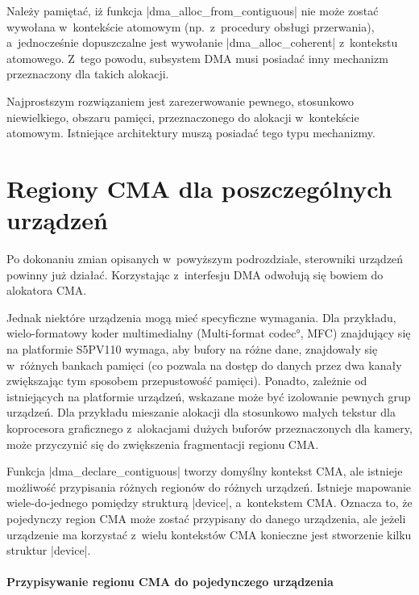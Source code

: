Należy pamiętać, iż funkcja \code|dma_alloc_from_contiguous|
nie może zostać wywołana w~kontekście atomowym (np.\ z~procedury
obsługi przerwania), a~jednocześnie dopuszczalne jest wywołanie
\code|dma_alloc_coherent| z~kontekstu atomowego.  Z~tego
powodu, subsystem DMA musi posiadać inny mechanizm przeznaczony dla
takich alokacji.

Najprostszym rozwiązaniem jest zarezerwowanie pewnego, stosunkowo
niewielkiego, obszaru pamięci, przeznaczonego do alokacji w~kontekście
atomowym.  Istniejące architektury muszą posiadać tego typu
mechanizmy.


\section{Regiony CMA dla poszczególnych urządzeń}\label{sec:priv-regions}

Po dokonaniu zmian opisanych w~powyższym podrozdziale, sterowniki
urządzeń powinny już działać.  Korzystając z~interfesju DMA odwołują
się bowiem do alokatora CMA.

Jednak niektóre urządzenia mogą mieć specyficzne wymagania.  Dla
przykładu, wielo-formatowy koder multimedialny (\ang{Multi-format
  codec}, MFC) znajdujący się na platformie S5PV110 wymaga, aby bufory
na różne dane, znajdowały się w~różnych bankach pamięci (co pozwala na
dostęp do danych przez dwa kanały zwiększając tym sposobem
przepustowość pamięci).  Ponadto, zależnie od istniejących na
platformie urządzeń, wskazane może być izolowanie pewnych grup
urządzeń.  Dla przykładu mieszanie alokacji dla stosunkowo małych
tekstur dla koprocesora graficznego z~alokacjami dużych buforów
przeznaczonych dla kamery, może przyczynić się do zwiększenia
fragmentacji regionu CMA.

Funkcja \code|dma_declare_contiguous| tworzy domyślny kontekst CMA,
ale istnieje możliwość przypisania różnych regionów do różnych
urządzeń.  Istnieje mapowanie wiele-do-jednego pomiędzy strukturą
\code|device|, a~kontekstem CMA.  Oznacza to, że pojedynczy region CMA
może zostać przypisany do danego urządzenia, ale jeżeli urządzenie ma
korzystać z~wielu kontekstów CMA konieczne jest stworzenie kilku
struktur \code|device|.

\paragraph{Przypisywanie regionu CMA do pojedynczego urządzenia} \hspace{0pt} \\

